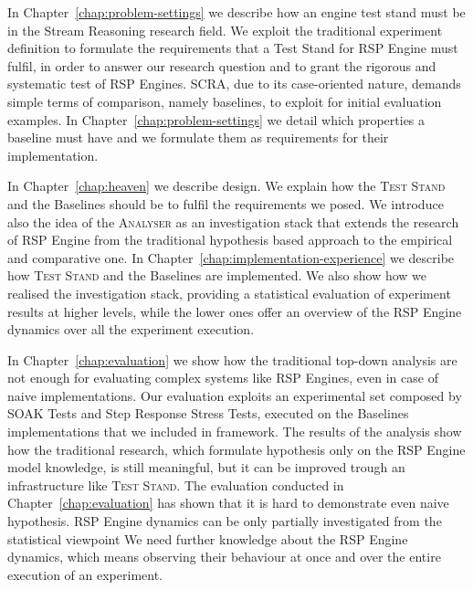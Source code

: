 In Chapter~\ref{chap:problem-settings} we describe how an engine test stand must be in the Stream Reasoning research field. We exploit the traditional experiment definition to formulate the requirements that a Test Stand for RSP Engine must fulfil, in order to answer our research question and to grant the rigorous and systematic test of RSP Engines. SCRA, due to its case-oriented nature, demands simple terms of comparison, namely baselines, to exploit for initial evaluation examples. In Chapter~\ref{chap:problem-settings} we detail which properties a baseline must have and we formulate them as requirements for their implementation.


In Chapter~\ref{chap:heaven} we describe \name design. We explain how the \textsc{Test Stand} and the Baselines should be to fulfil the requirements we posed. We introduce also the idea of the \textsc{Analyser} as an investigation stack that extends the research of RSP Engine from the traditional hypothesis based approach to the empirical and comparative one. In Chapter~\ref{chap:implementation-experience} we describe how \name \textsc{Test Stand} and the Baselines are implemented. We also show how we realised the investigation stack, providing a statistical evaluation of experiment results at higher levels, while the lower ones offer an overview of the RSP Engine dynamics over all the experiment execution.

In Chapter~\ref{chap:evaluation} we show how the traditional top-down analysis are not enough for evaluating complex systems like RSP Engines, even in case of naive implementations. Our evaluation exploits an experimental set composed by SOAK Tests and Step Response Stress Tests, executed on the Baselines implementations that we included in \name framework. The results of the analysis show how the traditional research, which formulate hypothesis only on the RSP Engine model knowledge, is still meaningful, but it can be improved trough an infrastructure like \name \textsc{Test Stand}. The evaluation conducted in Chapter~\ref{chap:evaluation} has shown that it is hard to demonstrate even naive hypothesis. RSP Engine dynamics can be only partially investigated from the statistical viewpoint We need further knowledge about the RSP Engine dynamics, which means observing their behaviour at once and over the entire execution of an experiment. %

